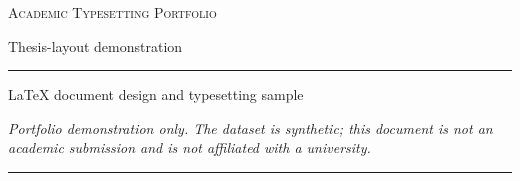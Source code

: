 \begin{titlepage}
  \centering
  \vspace*{1.3cm}
  {\large\scshape Academic Typesetting Portfolio\par}
  \vspace{0.35cm}
  {\small Thesis-layout demonstration\par}
  \vspace{1.15cm}
  \rule{0.78\textwidth}{0.6pt}\par
  \vspace{1.25cm}
  {\Huge\bfseries \thesistitle\par}
  \vspace{1.3cm}
  {\Large \thesisauthor\par}
  \vspace{0.45cm}
  {\normalsize LaTeX document design and typesetting sample\par}
  \vfill
  \begin{minipage}{0.78\textwidth}
    \centering
    {\small\textit{Portfolio demonstration only. The dataset is synthetic; this document is not an academic submission and is not affiliated with a university.}\par}
  \end{minipage}\par
  \vspace{1.1cm}
  {\thesisdate\par}
  \vspace{0.8cm}
  \rule{0.78\textwidth}{0.6pt}
\end{titlepage}
